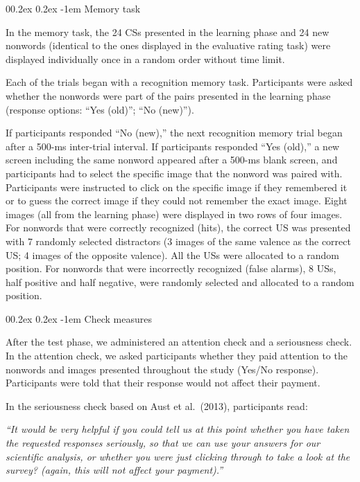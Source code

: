 \documentclass[
  man,floatsintext]{apa6}
\makeatletter
\let\oldparagraph\paragraph
\renewcommand{\paragraph}[1]{\oldparagraph{#1}\mbox{}}
\renewcommand{\paragraph}{\@startsection{paragraph}{4}{\parindent}%
  {0\baselineskip \@plus 0.2ex \@minus 0.2ex}%
  {-1em}%
  {\normalfont\normalsize\bfseries\itshape\typesectitle}}
\makeatother
\begin{document}
\hypertarget{memory-task}{%
\paragraph{Memory task}\label{memory-task}}

In the memory task, the 24 CSs presented in the learning phase and 24 new nonwords (identical to the ones displayed in the evaluative rating task) were displayed individually once in a random order without time limit.

Each of the trials began with a recognition memory task. Participants were asked whether the nonwords were part of the pairs presented in the learning phase (response options: ``Yes (old)''; ``No (new)'').

If participants responded ``No (new),'' the next recognition memory trial began after a 500-ms inter-trial interval. If participants responded ``Yes (old),'' a new screen including the same nonword appeared after a 500-ms blank screen, and participants had to select the specific image that the nonword was paired with. Participants were instructed to click on the specific image if they remembered it or to guess the correct image if they could not remember the exact image. Eight images (all from the learning phase) were displayed in two rows of four images. For nonwords that were correctly recognized (hits), the correct US was presented with 7 randomly selected distractors (3 images of the same valence as the correct US; 4 images of the opposite valence). All the USs were allocated to a random position. For nonwords that were incorrectly recognized (false alarms), 8 USs, half positive and half negative, were randomly selected and allocated to a random position.

\hypertarget{check-measures}{%
\paragraph{Check measures}\label{check-measures}}

After the test phase, we administered an attention check and a seriousness check. In the attention check, we asked participants whether they paid attention to the nonwords and images presented throughout the study (Yes/No response). Participants were told that their response would not affect their payment.

In the seriousness check based on Aust et al.~(2013), participants read:

\emph{``It would be very helpful if you could tell us at this point whether you have taken the requested responses seriously, so that we can use your answers for our scientific analysis, or whether you were just clicking through to take a look at the survey? (again, this will not affect your payment).''}
\end{document}
